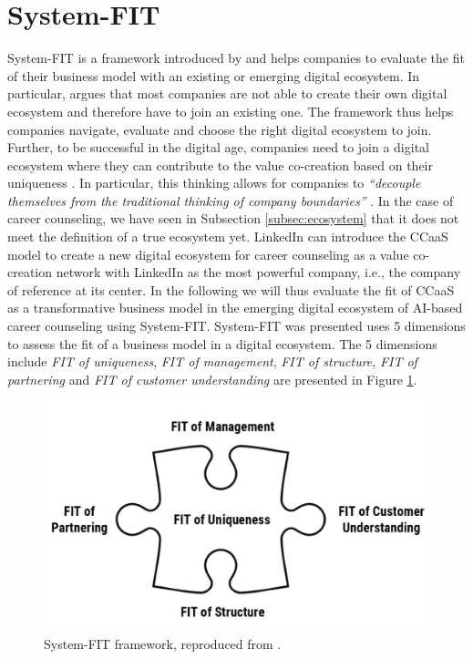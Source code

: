 \section{System-FIT}
\label{sec:system_fit}

System-FIT is a framework introduced by \citet{griederDigitalEcosystemHow2019,schwafertsDigitalBusinessDevelopment2020}
and helps companies to evaluate the fit of their business model with an existing or emerging digital ecosystem.
In particular, \cite{schwafertsDigitalBusinessDevelopment2020} argues that most companies are not able
to create their own digital ecosystem and therefore have to join an existing one. The framework
thus helps companies navigate, evaluate and choose the right digital ecosystem to join. 
Further, to be successful in the digital age, companies need to join a digital ecosystem where they can contribute 
to the value co-creation based on their uniqueness \citep{griederDigitalEcosystemHow2019}.
In particular, this thinking allows for companies to \textit{``decouple themselves from the traditional thinking of
company boundaries''} \citep[p.~42]{griederDigitalEcosystemHow2019}.
In the case of career counseling, we have seen in Subsection \ref{subsec:ecosystem} that it
does not meet the definition of a true ecosystem yet. LinkedIn can introduce the CCaaS model to 
create a new digital ecosystem for career counseling as a value co-creation network with LinkedIn
as the most powerful company, i.e., the company of reference at its center. In the following we will thus evaluate
the fit of CCaaS as a transformative business model in the emerging digital ecosystem of AI-based career counseling
using System-FIT. System-FIT was presented uses 5 dimensions to assess the fit of a business model in a digital ecosystem.
The 5 dimensions include \textit{FIT of uniqueness}, \textit{FIT of management}, \textit{FIT of structure}, \textit{FIT of
partnering} and \textit{FIT of customer understanding} are presented in Figure \ref{fig:system_fit}.

\begin{figure}[h!]
    \centering
    \caption{System-FIT framework, reproduced from \citep[p.~54]{griederDigitalEcosystemHow2019}.}
    \label{fig:system_fit}
    \includegraphics[width=0.7\linewidth]{figures/system-fit.png}
\end{figure}


